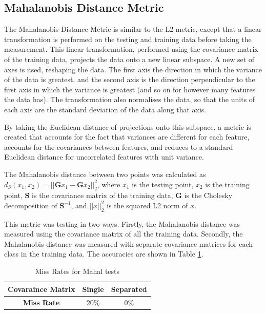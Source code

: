 \documentclass[10pt,twocolumn,letterpaper]{article}
\begin{document}
\subsection{Mahalanobis Distance Metric}

The Mahalanobis Distance Metric is similar to the L2 metric, except that a linear transformation is performed on the testing and training data before taking the measurement. This linear transformation, performed using the covariance matrix of the training data, projects the data onto a new linear subspace. A new set of axes is used, reshaping the data. The first axis the direction in which the variance of the data is greatest, and the second axis is the direction perpendicular to the first axis in which the variance is greatest (and so on for however many features the data has). The transformation also normalises the data, so that the units of each axis are the standard deviation of the data along that axis. 

By taking the Euclidean distance of projections onto this subspace, a metric is created that accounts for the fact that variances are different for each feature, accounts for the covariances between features, and reduces to a standard Euclidean distance for uncorrelated features with unit variance.

The Mahalanobis distance between two points was calculated as $d_S(x_1,x_2) = ||\mathbf{G}x_1 - \mathbf{G}x_2||^2_2$, where $x_1$ is the testing point, $x_2$ is the training point, $\mathbf{S}$ is the covariance matrix of the training data, $\mathbf{G}$ is the Cholesky decomposition of $\mathbf{S}^{-1}$, and $||x||^2_2$ is the squared L2 norm of $x$.

This metric was testing in two ways. Firstly, the Mahalanobis distance was measured using the covariance matrix of all the training data. Secondly, the Mahalanobis distance was measured with separate covariance matrices for each class in the training data. The accuracies are shown in Table \ref{tab:MissMahal}. 

\begin{table}[H]
\caption{Miss Rates for Mahal tests \label{tab:MissMahal}}
\small
\begin{center}
\begin{tabular}{|c| c c|}
\hline
\bf Covaraince Matrix & Single & Separated \\ [0.5ex]
\hline
\bf Miss Rate & 20\% & 0\% \\ [0.5ex]
\hline
\end{tabular}
\end{center}
\end{table}
\end{document}
